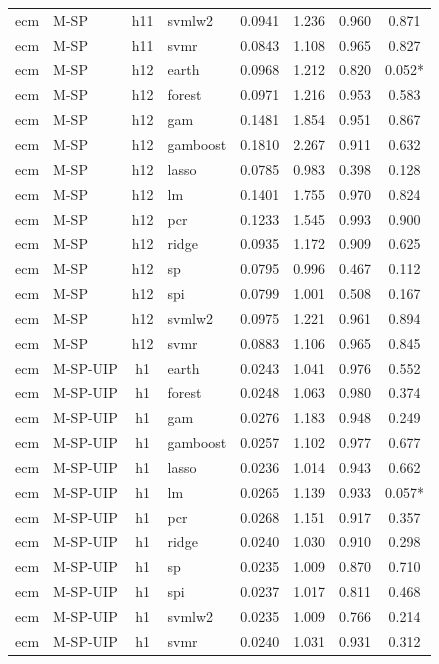 \begin{ThreePartTable}
\begin{longtable}[t]{llclcccc}
ecm & M-SP & h11 & svmlw2 & 0.0941 & 1.236 & 0.960 & 0.871\\
ecm & M-SP & h11 & svmr & 0.0843 & 1.108 & 0.965 & 0.827\\
\addlinespace
ecm & M-SP & h12 & earth & 0.0968 & 1.212 & 0.820 & 0.052*\\
ecm & M-SP & h12 & forest & 0.0971 & 1.216 & 0.953 & 0.583\\
ecm & M-SP & h12 & gam & 0.1481 & 1.854 & 0.951 & 0.867\\
ecm & M-SP & h12 & gamboost & 0.1810 & 2.267 & 0.911 & 0.632\\
ecm & M-SP & h12 & lasso & 0.0785 & 0.983 & 0.398 & 0.128\\
ecm & M-SP & h12 & lm & 0.1401 & 1.755 & 0.970 & 0.824\\
ecm & M-SP & h12 & pcr & 0.1233 & 1.545 & 0.993 & 0.900\\
ecm & M-SP & h12 & ridge & 0.0935 & 1.172 & 0.909 & 0.625\\
ecm & M-SP & h12 & sp & 0.0795 & 0.996 & 0.467 & 0.112\\
ecm & M-SP & h12 & spi & 0.0799 & 1.001 & 0.508 & 0.167\\
ecm & M-SP & h12 & svmlw2 & 0.0975 & 1.221 & 0.961 & 0.894\\
ecm & M-SP & h12 & svmr & 0.0883 & 1.106 & 0.965 & 0.845\\
\addlinespace
ecm & M-SP-UIP & h1 & earth & 0.0243 & 1.041 & 0.976 & 0.552\\
ecm & M-SP-UIP & h1 & forest & 0.0248 & 1.063 & 0.980 & 0.374\\
ecm & M-SP-UIP & h1 & gam & 0.0276 & 1.183 & 0.948 & 0.249\\
ecm & M-SP-UIP & h1 & gamboost & 0.0257 & 1.102 & 0.977 & 0.677\\
ecm & M-SP-UIP & h1 & lasso & 0.0236 & 1.014 & 0.943 & 0.662\\
ecm & M-SP-UIP & h1 & lm & 0.0265 & 1.139 & 0.933 & 0.057*\\
ecm & M-SP-UIP & h1 & pcr & 0.0268 & 1.151 & 0.917 & 0.357\\
ecm & M-SP-UIP & h1 & ridge & 0.0240 & 1.030 & 0.910 & 0.298\\
ecm & M-SP-UIP & h1 & sp & 0.0235 & 1.009 & 0.870 & 0.710\\
ecm & M-SP-UIP & h1 & spi & 0.0237 & 1.017 & 0.811 & 0.468\\
ecm & M-SP-UIP & h1 & svmlw2 & 0.0235 & 1.009 & 0.766 & 0.214\\
ecm & M-SP-UIP & h1 & svmr & 0.0240 & 1.031 & 0.931 & 0.312\\

\end{longtable}
\end{ThreePartTable}
